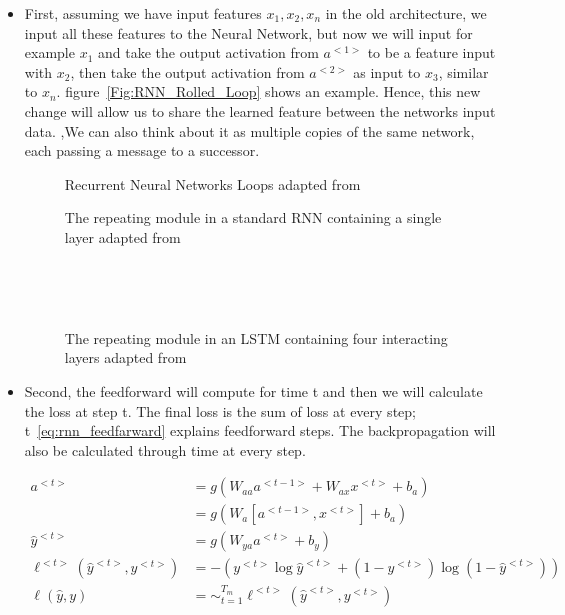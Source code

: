 \begin{itemize}
\item First, assuming we have input features $x_1, x_2, x_n$ in the old architecture, we input all these features to the Neural Network, but now we will input for example $x_1$ and take the output activation from $a^{<1>}$ to be a feature input with $x_2$, then take the output activation from $a^{<2>}$ as input to $x_3$, similar to $x_n$. figure~\ref{Fig:RNN_Rolled_Loop} shows an example. Hence, this new change will allow us to share the learned feature between the networks input data. ,We can also think about it as multiple copies of the same network, each passing a message to a successor\cite{colah}.%

\begin{figure}[t]
\minipage{\textwidth}
\centering

\endminipage\hfill
\caption{Recurrent Neural Networks Loops adapted from~\cite{colah}}\label{Fig:RNN_Rolled_Loop}


\endminipage\hfill
{}

\endminipage\hfill
{}%

\endminipage
\caption{The repeating module in a standard RNN containing a single layer adapted from~\cite{colah}}~\label{Fig:LSTM_SimpleRNN}


\endminipage\hfill
{}

\endminipage\hfill
{}%

\endminipage
\caption{The repeating module in an LSTM containing four interacting layers adapted from~\cite{colah}}~\label{Fig:LSTM_Cell_Chaining}
\end{figure}


\item Second, the feedforward will compute for time t and then we will calculate the loss at step t. The final loss is the sum of loss at every step; t~\eqref{eq:rnn_feedfarward} explains feedforward steps. The backpropagation will also be calculated through time at every step.%
 
 \begin{subequations}\label{eq:rnn_feedfarward}
\begin{align}
 a^{<t>} & = g(W_{aa}a^{<t-1>}+ W_{ax}x^{<t>}+b_a)\\
  & = g(W_a[a^{<t-1>},x^{<t>}]+ b_a)\\
 \widehat{y}^{<t>} & = g(W_{ya}a^{<t>}+ b_y)
 \\ \ell^{<t>}(\widehat{y}^{<t>},y^{<t>}) & = - (y^{<t>} \log \widehat{y}^{<t>} + (1-y^{<t>}) \log (1-\widehat{y}^{<t>}))
\\ \ell(\widehat{y},y) & = \sim_{t=1}^{T_m} \ell^{<t>}(\widehat{y}^{<t>},y^{<t>})   
\end{align}
\end{subequations}%
 \end{itemize}


